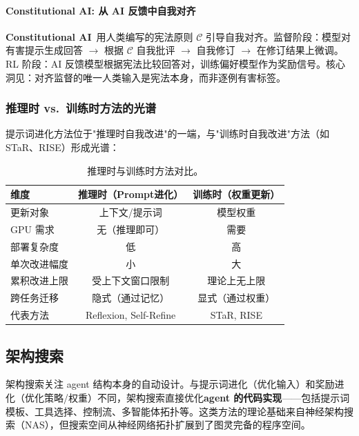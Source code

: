 \paragraph{Constitutional AI: 从 AI 反馈中自我对齐}

\textbf{Constitutional AI}~\citep{constitutionalai2022}用人类编写的宪法原则 $\mathcal{C}$ 引导自我对齐。监督阶段：模型对有害提示生成回答 $\to$ 根据 $\mathcal{C}$ 自我批评 $\to$ 自我修订 $\to$ 在修订结果上微调。RL 阶段：AI 反馈模型根据宪法比较回答对，训练偏好模型作为奖励信号。核心洞见：对齐监督的唯一人类输入是宪法本身，而非逐例有害标签。

\subsubsection{推理时 vs.\ 训练时方法的光谱}

提示词进化方法位于"推理时自我改进"的一端，与"训练时自我改进"方法（如 STaR、RISE）形成光谱：

\begin{table}[htbp]
\centering
\caption{推理时与训练时方法对比。}
\label{tab:inference-vs-training}
\begin{tabular}{lcc}
\toprule
\textbf{维度} & \textbf{推理时（Prompt进化）} & \textbf{训练时（权重更新）} \\
\midrule
更新对象 & 上下文/提示词 & 模型权重 \\
GPU 需求 & 无（推理即可） & 需要 \\
部署复杂度 & 低 & 高 \\
单次改进幅度 & 小 & 大 \\
累积改进上限 & 受上下文窗口限制 & 理论上无上限 \\
跨任务迁移 & 隐式（通过记忆） & 显式（通过权重） \\
代表方法 & Reflexion, Self-Refine & STaR, RISE \\
\bottomrule
\end{tabular}
\end{table}

\subsection{架构搜索}\label{sec:arch}

架构搜索关注 agent 结构本身的自动设计。与提示词进化（优化输入）和奖励进化（优化策略/权重）不同，架构搜索直接优化\textbf{agent 的代码实现}——包括提示词模板、工具选择、控制流、多智能体拓扑等。这类方法的理论基础来自神经架构搜索（NAS），但搜索空间从神经网络拓扑扩展到了图灵完备的程序空间。

